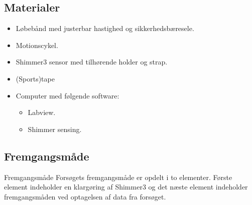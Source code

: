 \subsection{Materialer}
\begin{itemize}
	\item Løbebånd med justerbar hastighed og sikkerhedsbæresele.
	\item Motionscykel.
	\item Shimmer3 sensor med tilhørende holder og strap.
	\item (Sports)tape
	\item Computer med følgende software:
	\begin{itemize}
		\item Labview.
		\item Shimmer sensing.
	\end{itemize}
\end{itemize}

\subsection{Fremgangsmåde}
Fremgangsmåde
Forsøgets fremgangsmåde er opdelt i to elementer. Første element indeholder en klargøring af Shimmer3 og det næste element indeholder fremgangsmåden ved optagelsen af data fra forsøget.

